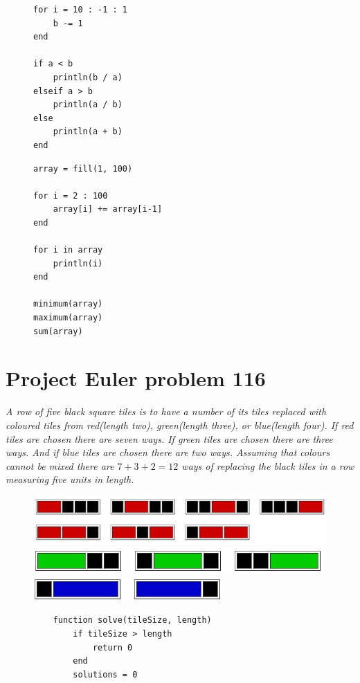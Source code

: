 \documentclass[landscape, a0]{sciposter}
\begin{document}
\begin{multicols}{3}
\begin{multicols}{3}
\begin{figure}[H]
\begin{lstlisting}[frame=none, numbers=none]
for i = 10 : -1 : 1
	b -= 1
end

if a < b
	println(b / a)
elseif a > b
	println(a / b)
else
	println(a + b)
end
		\end{lstlisting}
	\end{figure}
	\hfill
	\begin{figure}[H]
\begin{lstlisting}[frame=none, numbers=none]
array = fill(1, 100)

for i = 2 : 100
	array[i] += array[i-1]
end

for i in array
	println(i)
end

minimum(array)
maximum(array)
sum(array)
		\end{lstlisting}
	\end{figure}
\end{multicols}
\section{Project Euler problem 116}
\textit{A row of five black square tiles is to have a number of its tiles replaced with coloured tiles from red(length two), green(length three), or blue(length four). If red tiles are chosen there are seven ways. If green tiles are chosen there are three ways. And if blue tiles are chosen there are two ways. Assuming that colours cannot be mixed there are $7+3+2=12$ ways of replacing the black tiles in a row measuring five units in length.}
\hspace*{-1in}
\begin{figure}[H]
	\centering
	\includegraphics[scale=1.635]{fig/1161.jpg}
	\includegraphics[scale=2.2]{fig/1162.jpg} 
	\includegraphics[scale=2.2]{fig/1163.jpg} 
\end{figure}
\hspace*{-0.3in}
\begin{figure}[H]
	\centering
	\begin{lstlisting}
	function solve(tileSize, length)
		if tileSize > length
			return 0
		end
		solutions = 0
	

\end{lstlisting}
\end{figure}
\end{multicols}
\end{document}
